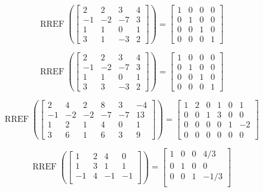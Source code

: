 \documentclass{article}
\DeclareMathOperator{\RREF}{RREF}
\begin{document}
\[\RREF \left( 
\begin{bmatrix} 
2 & 2 & 3 & 4 \\ 
-1 & -2 & -7 & 3 \\ 
1 & 1 & 0 & 1 \\ 
3 & 1 & -3 & 2 
\end{bmatrix} \right) = 
\begin{bmatrix} 
1 & 0 & 0 & 0 \\ 
0 & 1 & 0 & 0 \\ 
0 & 0 & 1 & 0 \\ 
0 & 0 & 0 & 1
\end{bmatrix}\]

\[\RREF \left( 
\begin{bmatrix} 
2 & 2 & 3 & 4 \\ 
-1 & -2 & -7 & 3 \\ 
1 & 1 & 0 & 1 \\ 
3 & 3 & -3 & 2 
\end{bmatrix} \right) = 
\begin{bmatrix} 
1 & 0 & 0 & 0 \\ 
0 & 1 & 0 & 0 \\ 
0 & 0 & 1 & 0 \\ 
0 & 0 & 0 & 1
\end{bmatrix}\]

\[\RREF \left(  \begin{bmatrix} 
2 & 4 & 2 & 8 & 3 & -4 \\ 
-1 & -2 & -2 & -7 & -7 & 13\\ 
1 & 2 & 1 & 4 & 0 &1\\ 
3 & 6 & 1 & 6 &3 & 9
\end{bmatrix} \right)= 
\begin{bmatrix} 
1 & 2 & 0 & 1 & 0 & 1 \\ 
0 & 0 & 1 & 3 &0 & 0\\ 
0 & 0 & 0 & 0 & 1 & -2\\ 
0 & 0 & 0 & 0&0 &0 
\end{bmatrix}\]




\[
  \RREF\left(\begin{bmatrix}
    1 & 2 & 4 & 0 \\
    1 & 3 & 1 & 1 \\
    -1 & 4 & -1 & -1 \\
  \end{bmatrix} \right) =
  \begin{bmatrix}
    1 & 0 & 0 & 4/3 \\
    0 & 1 & 0 & 0 \\
    0 & 0 & 1 & -1/3 \\
  \end{bmatrix}
\]
\end{document}
